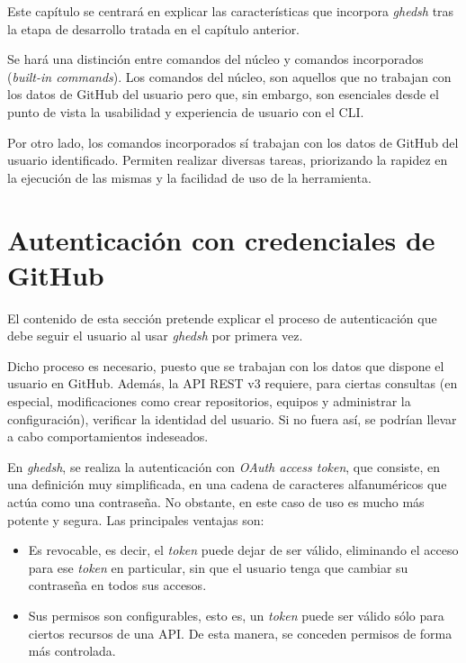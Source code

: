 
Este capítulo se centrará en explicar las características que incorpora {\it ghedsh} tras la etapa de desarrollo tratada en el capítulo anterior.
\bigskip

Se hará una distinción entre comandos del núcleo y comandos incorporados ({\it built-in commands}). Los comandos del núcleo, son aquellos que no trabajan con los datos de GitHub del usuario pero que, sin embargo, son
esenciales desde el punto de vista la usabilidad y experiencia de usuario con el CLI.
\bigskip

Por otro lado, los comandos incorporados sí trabajan con los datos de GitHub del usuario identificado. Permiten realizar diversas tareas, priorizando la rapidez en la ejecución de las mismas y la facilidad de uso de la herramienta.

\section{Autenticación con credenciales de GitHub}
\label{3:sec:1}

El contenido de esta sección pretende explicar el proceso de autenticación que debe seguir el usuario al usar {\it ghedsh} por primera vez.
\bigskip

Dicho proceso es necesario, puesto que se trabajan con los datos que dispone el usuario en GitHub. Además, la API REST v3 requiere, para ciertas consultas (en especial, modificaciones como crear repositorios, equipos y administrar la configuración), verificar la identidad del usuario. Si no fuera así, se podrían llevar a cabo comportamientos indeseados.
\bigskip

En {\it ghedsh}, se realiza la autenticación con {\it OAuth access token}\cite{B16}, que consiste, en una definición muy simplificada, en una cadena de caracteres alfanuméricos que actúa como una contraseña. No obstante,
en este caso de uso es mucho más potente y segura. Las principales ventajas son:
\begin{itemize}
	\item Es revocable, es decir, el {\it token} puede dejar de ser válido, eliminando el acceso para ese {\it token} en particular, sin que el usuario tenga que cambiar su contraseña en todos sus accesos.
	\item Sus permisos son configurables, esto es, un {\it token} puede ser válido sólo para ciertos recursos de una API. De esta manera, se conceden permisos de forma más controlada.
\end{itemize}

